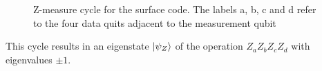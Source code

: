 \begin{figure}
    \centering
    \caption[Z-measure cycle for the surface code]{Z-measure cycle for the surface code. The labels a, b, c and d refer to the four data quits adjacent to the measurement qubit}
    \label{fig:Zmeasurecycle}
\end{figure}
This cycle results in an eigenstate $\ket{\psi_Z}$ of the operation $Z_aZ_bZ_cZ_d$ with eigenvalues $\pm 1$.

